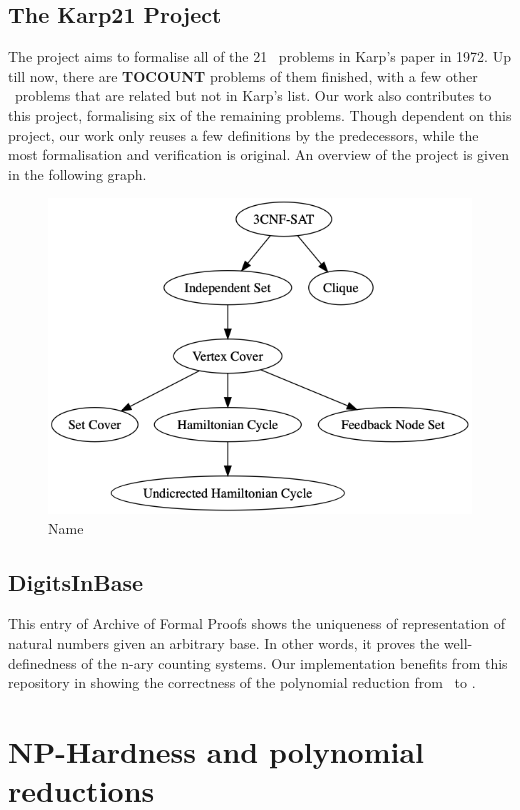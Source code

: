 \subsection*{The Karp21 Project}
The project aims to formalise all of the 21 \NPH\ problems in Karp's paper in 1972. Up till now, there are \textbf{TOCOUNT} problems of them finished, with a few other \NPH\ problems that are related but not in Karp's list. Our work also contributes to this project, formalising six of the remaining problems. Though dependent on this project, our work only reuses a few definitions by the predecessors, while the most formalisation and verification is original. An overview of the project is given in the following graph.
\begin{figure}[h!]
\centering
\includegraphics[scale=0.4]{../figures/reductions.png}
\caption{Name}
\end{figure}

\subsection*{DigitsInBase}
This entry of Archive of Formal Proofs shows the uniqueness of representation of natural numbers given an arbitrary base. In other words, it proves the well-definedness of the n-ary counting systems. Our implementation benefits from this repository in showing the correctness of the polynomial reduction from \XC\ to \Part.

\section{NP-Hardness and polynomial reductions}
